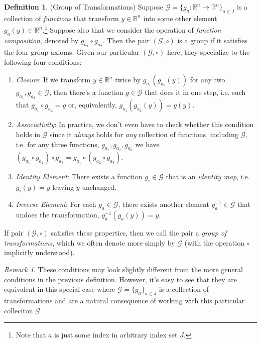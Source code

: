 \documentclass[12pt]{article}
\numberwithin{equation}{section} %
\theoremstyle{plain}
\theoremstyle{definition}
\newtheorem{defn}[thm]{Definition}
\theoremstyle{remark}
\newtheorem*{rmk}{Remark}
\newcommand{\ra}{\rightarrow}
\newcommand{\calG}{\mathcal{G}}
\newcommand{\R}{\mathbb{R}}
\newcommand{\Rn}{\mathbb{R}^n}
\begin{document}
\begin{defn}(Group of Transformations)
Suppose $\calG=\{g_a:\R^n\ra\R^n\}_{a\in J}$ is a collection
of \emph{functions} that transform $y\in\Rn$ into some other element
$g_a(y)\in\Rn$.\footnote{%
  Note that $a$ is just some index in arbitrary index set $J$.
}
Suppose also that we consider the operation
of \emph{function composition}, denoted by $g_{a_1}\circ
g_{a_2}$.
Then the pair $(\calG,\circ)$ is a group if it satisfies the four group
axioms. Given our particular $(\calG,\circ)$ here, they specialize to
the following four conditions:
\begin{enumerate}[label=(\roman*)]
  \item \emph{Closure}:
    If we transform $y\in\Rn$ twice by $g_{a_1}(g_{a_2}(y))$
    for any two $g_{a_1},g_{a_2}\in\calG$, then there's a
    function $g\in\calG$ that does it in one step, i.e. such that
    $g_{a_1}\circ g_{a_2}=g$ or, equivalently,
    $g_{a_1}(g_{a_2}(y))=g(y)$.

  \item \emph{Associativity}:
    In practice, we don't even have to check whether this condition
    holds in $\calG$ since it \emph{always} holds for \emph{any}
    collection of functions, including $\calG$, i.e.
    for any three functions,
    $g_{a_1},g_{a_2},g_{a_3}$
    we have $(g_{a_1}\circ g_{a_2})\circ g_{a_3} =
    g_{a_1} \circ (g_{a_2}\circ g_{a_3})$.

  \item \emph{Identity Element}:
    There exists a function $g_i\in\calG$ that is an
    \emph{identity map}, i.e. $g_i(y)=y$ leaving $y$ unchanged.

  \item \emph{Inverse Element}:
    For each $g_a\in\calG$, there exists another element
    $g_{a}^{-1}\in\calG$ that undoes the transformation,
    $g^{-1}_a(g_{a}(y))=y$.
\end{enumerate}
If pair $(\calG,\circ)$ satisfies these properties, then we call the
pair a \emph{group of transformations}, which we often denote more
simply by $\calG$ (with the operation $\circ$ implicitly understood).
\end{defn}
\begin{rmk}
These conditions may look slightly different from the more general
conditions in the previous definition.
However, it's easy to see that they are equivalent in this special case
where $\calG=\{g_a\}_{a\in J}$ is a collection of transformations
and are a natural consequence of working with this particular colleciton
$\calG$
\end{rmk}
\end{document}

